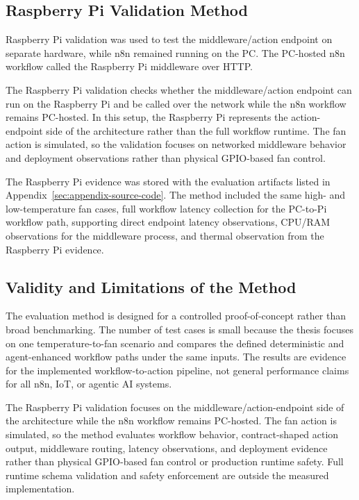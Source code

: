 \subsection{Raspberry Pi Validation Method}\label{subsec:pi-validation-method}



Raspberry Pi validation was used to test the middleware/action endpoint on separate hardware, while n8n remained running on the PC. The PC-hosted n8n workflow called the Raspberry Pi middleware over HTTP.

The Raspberry Pi validation checks whether the middleware/action endpoint can run on the Raspberry Pi and be called over the network while the n8n workflow remains PC-hosted. In this setup, the Raspberry Pi represents the action-endpoint side of the architecture rather than the full workflow runtime. The fan action is simulated, so the validation focuses on networked middleware behavior and deployment observations rather than physical GPIO-based fan control.


The Raspberry Pi evidence was stored with the evaluation artifacts listed in Appendix~\ref{sec:appendix-source-code}. The method included the same high- and low-temperature fan cases, full workflow latency collection for the PC-to-Pi workflow path, supporting direct endpoint latency observations, CPU/RAM observations for the middleware process, and thermal observation from the Raspberry Pi evidence.

\subsection{Validity and Limitations of the Method}\label{subsec:method-validity-limitations}


The evaluation method is designed for a controlled proof-of-concept rather than broad benchmarking. The number of test cases is small because the thesis focuses on one temperature-to-fan scenario and compares the defined deterministic and agent-enhanced workflow paths under the same inputs. The results are evidence for the implemented workflow-to-action pipeline, not general performance claims for all n8n, IoT, or agentic AI systems.



The Raspberry Pi validation focuses on the middleware/action-endpoint side of the architecture while the n8n workflow remains PC-hosted. The fan action is simulated, so the method evaluates workflow behavior, contract-shaped action output, middleware routing, latency observations, and deployment evidence rather than physical GPIO-based fan control or production runtime safety. Full runtime schema validation and safety enforcement are outside the measured implementation.


